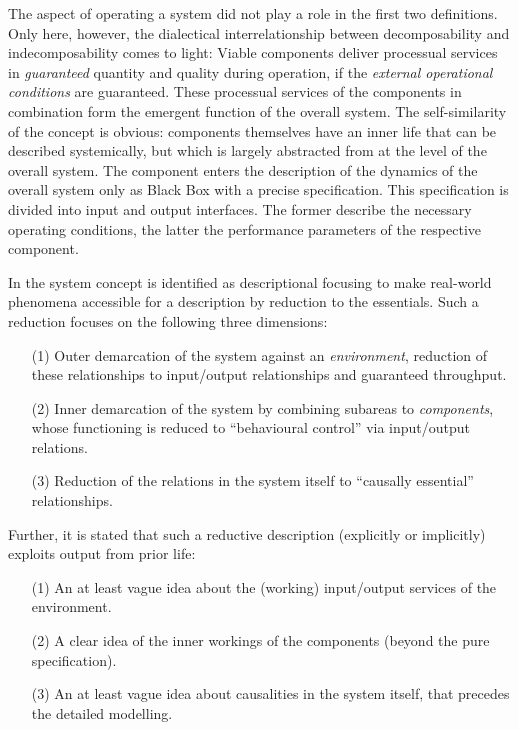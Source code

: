 \documentclass[11pt,a4paper]{article}
\begin{document}
The aspect of operating a system did not play a role in the first two
definitions.  Only here, however, the dialectical interrelationship between
decomposability and indecomposability comes to light: Viable components
deliver processual services in \emph{guaranteed} quantity and quality during
operation, if the \emph{external operational conditions} are guaranteed.
These processual services of the components in combination form the emergent
function of the overall system. The self-similarity of the concept is obvious:
components themselves have an inner life that can be described systemically,
but which is largely abstracted from at the level of the overall system. The
component enters the description of the dynamics of the overall system only as
Black Box with a precise specification.  This specification is divided into
input and output interfaces.  The former describe the necessary operating
conditions, the latter the performance parameters of the respective component.

In \cite{Graebe-mts} the system concept is identified as descriptional
focusing to make real-world phenomena accessible for a description by
reduction to the essentials.  Such a reduction focuses on the following three
dimensions:
\begin{itemize}
\item[(1)] Outer demarcation of the system against an \emph{environment},
  reduction of these relationships to input/output relationships and
  guaranteed throughput.
\item[(2)] Inner demarcation of the system by combining subareas to
  \emph{components}, whose functioning is reduced to “behavioural control” via
  input/output relations.
\item[(3)] Reduction of the relations in the system itself to “causally
  essential” relationships.
\end{itemize}
Further, it is stated that such a reductive description (explicitly or
implicitly) exploits output from prior life:
\begin{itemize}
\item[(1)] An at least vague idea about the (working) input/output services of
  the environment.
\item[(2)] A clear idea of the inner workings of the components (beyond the
  pure specification).
\item[(3)] An at least vague idea about causalities in the system itself, that
  precedes the detailed modelling.
\end{itemize}
\end{document}

